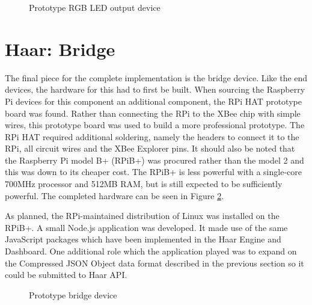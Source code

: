     \begin{figure}
      \centering
      \caption{Prototype RGB LED output device}\label{figure:led-device}
    \end{figure}

  \section{Haar: Bridge}
    The final piece for the complete implementation is the bridge device. Like the end devices, the hardware for this had to first be built. When sourcing the Raspberry Pi devices for this component an additional component, the RPi HAT prototype board was found. Rather than connecting the RPi to the XBee chip with simple wires, this prototype board was used to build a more professional prototype. The RPi HAT required additional soldering, namely the headers to connect it to the RPi, all circuit wires and the XBee Explorer pins. It should also be noted that the Raspberry Pi model B+ (RPiB+)  was procured rather than the model 2 and this was down to its cheaper cost. The RPiB+ is less powerful with a single-core 700MHz processor and 512MB RAM, but is still expected to be sufficiently powerful. The completed hardware can be seen in Figure \ref{figure:bridge-device}.

    As planned, the RPi-maintained distribution of Linux was installed on the RPiB+. A small Node.js application was developed. It made use of the same JavaScript packages which have been implemented in the Haar Engine and Dashboard. One additional role which the application played was to expand on the Compressed JSON Object data format described in the previous section so it could be submitted to Haar API.

    \begin{figure}
      \centering
      \caption{Prototype bridge device}\label{figure:bridge-device}
    \end{figure}
